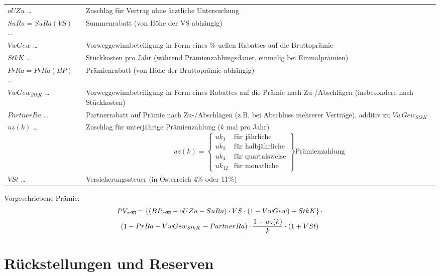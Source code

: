 \documentclass[a4paper,10pt]{article}
\makeatletter
\DeclareRobustCommand{\act}[2][]{%
\def\arraystretch{0}%
\setlength\arraycolsep{0.5pt}%
\setlength\arrayrulewidth{0.5pt}%
\setbox0=\hbox{$\scriptstyle#1\ifx#1\empty{asdf}\else:\fi#2$}%
\begin{array}[b]{*2{@{}>{\scriptstyle}c}|}
\cline{2-2}%
\rule[1.25pt]{0pt}{\ht0}%
#1\ifx#1\empty\else:\fi & #2%
\end{array}%
}
\makeatother
\begin{document}
\begin{longtable}{p{4cm}p{11cm}}
 $oUZu$ \dots & Zuschlag für Vertrag ohne ärztliche Untersuchung\\
 $SuRa=SuRa(VS)$ \dots & Summenrabatt (von Höhe der VS abhängig)\\
 $VwGew$ \dots & Vorweggewinnbeteiligung in Form eines \%-uellen Rabattes auf die Bruttoprämie\\
 $StkK$ \dots & Stückkosten pro Jahr (während Prämienzahlungsdauer, einmalig bei Einmalprämien)\\
 $PrRa=PrRa(BP)$ \dots & Prämienrabatt (von Höhe der Bruttoprämie abhängig)\\
 $VwGew_{StkK}$ \dots & Vorweggewinnbeteiligung in Form eines Rabattes auf die Prämie nach Zu-/Abschlägen (insbesondere nach Stückkosten)\\
 $PartnerRa$ \dots & Partnerrabatt auf Prämie nach Zu-/Abschlägen (z.B. bei Abschluss mehrerer Verträge), additiv zu $VwGew_{StkK}$\\
 
 $uz(k)$ \dots & Zuschlag für unterjährige Prämienzahlung ($k$ mal pro Jahr)
 \begin{equation*}
  uz(k)=\left.\begin{cases}uk_1 & \text {für jährliche}\\uk_2 & \text {für halbjährliche} \\ uk_4 & \text{für quartalsweise}\\uk_{12} & \text{für monatliche}\end{cases}\right\} \text{Prämienzahlung}
 \end{equation*}\\
 
 
 $VSt$ \dots & Versicherungssteuer (in Österreich 4\% oder 11\%) \\

\end{longtable}


Vorgeschriebene Prämie:
\begin{multline*}
PV_{\act[x]{n}} = \left\{ (BP_{\act[x]{n}} + oUZu - SuRa) \cdot VS \cdot (1-VwGew) + StkK\right\} \cdot \\ \left(1-PrRa-VwGew_{StkK}-PartnerRa\right)\cdot \frac{1+uz(k)}{k} \cdot (1+VSt)
% 
\end{multline*}


\pagebreak

\section{Rückstellungen und Reserven}
\end{document}
